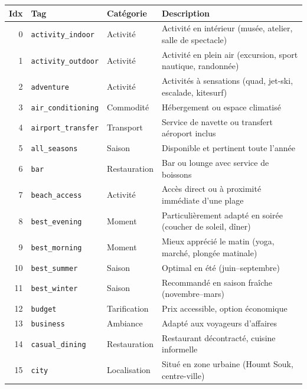 \begin{center}
\label{tab:tagvocab}
\footnotesize
\begin{longtable}{r p{3.2cm} p{2.5cm} p{6.5cm}}
    \toprule
    \textbf{Idx} & \textbf{Tag} & \textbf{Catégorie} & \textbf{Description} \\
    \midrule
    \endhead
    0  & \texttt{activity\_indoor}  & Activité    & Activité en intérieur (musée, atelier, salle de spectacle) \\
    1  & \texttt{activity\_outdoor} & Activité    & Activité en plein air (excursion, sport nautique, randonnée) \\
    2  & \texttt{adventure}         & Activité    & Activités à sensations (quad, jet-ski, escalade, kitesurf) \\
    3  & \texttt{air\_conditioning} & Commodité   & Hébergement ou espace climatisé \\
    4  & \texttt{airport\_transfer} & Transport   & Service de navette ou transfert aéroport inclus \\
    5  & \texttt{all\_seasons}      & Saison      & Disponible et pertinent toute l'année \\
    6  & \texttt{bar}               & Restauration & Bar ou lounge avec service de boissons \\
    7  & \texttt{beach\_access}     & Activité    & Accès direct ou à proximité immédiate d'une plage \\
    8  & \texttt{best\_evening}     & Moment      & Particulièrement adapté en soirée (coucher de soleil, dîner) \\
    9  & \texttt{best\_morning}     & Moment      & Mieux apprécié le matin (yoga, marché, plongée matinale) \\
    10 & \texttt{best\_summer}      & Saison      & Optimal en été (juin–septembre) \\
    11 & \texttt{best\_winter}      & Saison      & Recommandé en saison fraîche (novembre–mars) \\
    12 & \texttt{budget}            & Tarification & Prix accessible, option économique \\
    13 & \texttt{business}          & Ambiance    & Adapté aux voyageurs d'affaires \\
    14 & \texttt{casual\_dining}    & Restauration & Restaurant décontracté, cuisine informelle \\
    15 & \texttt{city}              & Localisation & Situé en zone urbaine (Houmt Souk, centre-ville) \\

\end{longtable}
\end{center}
